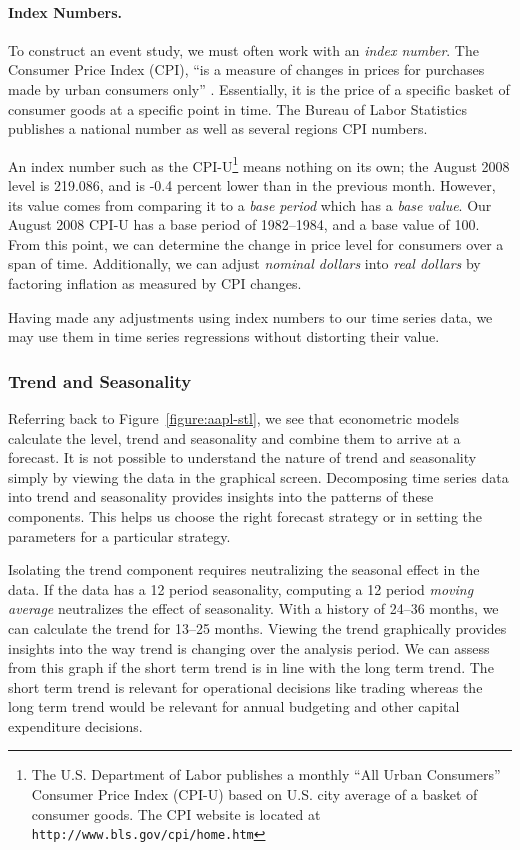 \paragraph{Index Numbers.}
To construct an event study, we must often work with an \emph{index number}.  The Consumer Price Index (CPI), ``is a measure of changes in prices for purchases made by urban consumers only'' \cite[p. 91]{rogers-1998}. Essentially, it is the price of a specific basket of consumer goods at a specific point in time. The Bureau of Labor Statistics publishes a national number as well as several regions CPI numbers.

An index number such as the CPI-U\footnote{The U.S. Department of Labor publishes a monthly ``All Urban Consumers'' Consumer Price Index (CPI-U) based on U.S. city average of a basket of consumer goods. The CPI website is located at \\ \texttt{http://www.bls.gov/cpi/home.htm}} means nothing on its own; the August 2008 level is 219.086, and is -0.4 percent lower than in the previous month. However, its value comes from comparing it to a \emph{base period}  which has a \emph{base value}.  Our August 2008 CPI-U has a base period of 1982--1984, and a base value of 100. From this point, we can determine the change in price level for consumers over a span of time. Additionally, we can adjust \emph{nominal dollars} into \emph{real dollars} by factoring inflation as measured by CPI changes.

Having made any adjustments using index numbers to our time series data, we may use them in time series regressions without distorting their value.

\subsubsection{Trend and Seasonality}
Referring back to Figure~\ref{figure:aapl-stl}, we see that econometric models calculate the level, trend and seasonality and combine them to arrive at a forecast. It is not possible to understand the nature of trend and seasonality simply by viewing the data in the graphical screen. Decomposing time series data into trend and seasonality provides insights into the patterns of these components. This helps us choose the right forecast strategy or in setting the
parameters for a particular strategy.

Isolating the trend component requires neutralizing the seasonal effect in the data. If the data has a 12 period seasonality, computing a 12 period \emph{moving average} neutralizes the effect of seasonality. With a history of 24--36 months, we can calculate the trend for 13--25 months. Viewing the trend graphically provides insights into the way trend is changing over the analysis period. We can assess from this graph if the short term trend is in line with the long term trend. The short term trend is relevant for operational decisions like trading whereas the long term trend would be relevant for annual budgeting and other capital expenditure decisions.

